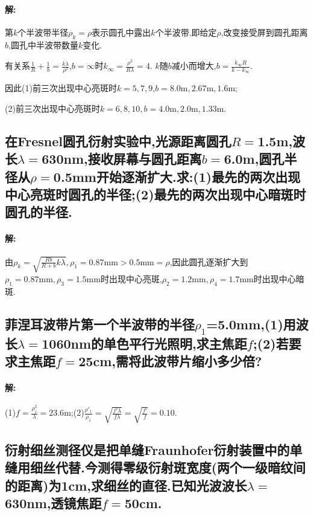 \documentclass[UTF8]{article}
\newcommand{\m}{\mathrm{m}}
\newcommand{\mm}{\mathrm{mm}}
\begin{document}
    \paragraph{解: }\hspace{-10pt}第$\!k\!$个半波带半径$\!\rho_k=\rho\!$表示圆孔中露出$\!k\!$个半波带.即给定$\!\rho$,改变接受屏到圆孔距离$\!b$,圆孔中半波带数量$\!k\!$变化.
    \par 有关系$\frac{1}{R}+\frac{1}{b}=\frac{k\lambda}{\rho^2}$,$b=\infty$时$k_\infty=\frac{\rho^2}{R\lambda}=4$. $k$随$b$减小而增大,$b=\frac{k_\infty R}{k-k_\infty}$.
    \par 因此(1)前三次出现中心亮斑时$k=5,7,9$,$b=8.0\m,2.67\m,1.6\m$;
    \par (2)前三次出现中心亮斑时$k=6,8,10,b=4.0\m,2.0\m,1.33\m$.

    \subsection{在$\!\!$Fresnel$\!\!$圆孔衍射实验中,光源距离圆孔$\!R\!=$1.5m,波长$\!\lambda\!=$630nm,接收屏幕与圆孔距离$\!b\!=$6.0m,圆孔半径从$\rho=$0.5mm开始逐渐扩大.求:(1)$\!\!$最先的两次出现中心亮斑时圆孔的半径;(2)$\!\!$最先的两次出现中心暗斑时圆孔的半径.} %
    \paragraph{解: }由$\rho_k=\sqrt{\frac{Rb}{R+b}k\lambda},\rho_1=0.87\mm>0.5\mm=\rho$,因此圆孔逐渐扩大到$\rho_1=0.87\mm,\rho_3=1.5\mm$时出现中心亮斑,$\rho_2=1.2\mm,\rho_4=1.7\mm$时出现中心暗斑.

    \setcounter{subsection}{8}
    \subsection{菲涅耳波带片第一个半波带的半径$\rho_1$=5.0mm,(1)用波长$\lambda=$1060nm的单色平行光照明,求主焦距$f$;(2)若要求主焦距$f=$25cm,需将此波带片缩小多少倍?} %
    \paragraph{解: }(1)$f=\frac{\rho^2_1}{\lambda}=23.6\m$;(2)$\frac{\rho'_1}{\rho_1}=\sqrt{\frac{f'\lambda}{f\lambda}}=\sqrt{\frac{f'}{f}}=0.10$.

    \setcounter{subsection}{13}
    \subsection{衍射细丝测径仪是把单缝Fraunhofer衍射装置中的单缝用细丝代替.今测得零级衍射斑宽度(两个一级暗纹间的距离)为1cm,求细丝的直径.已知光波波长$\lambda=$630nm,透镜焦距$f=$50cm.} %
\end{document}
